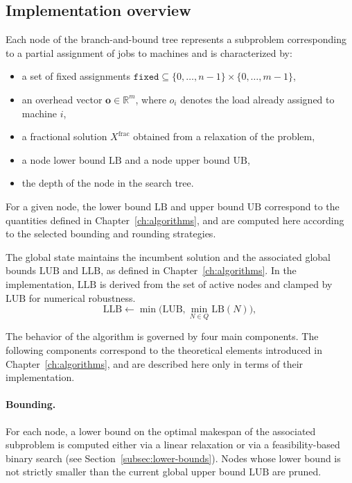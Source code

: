 \subsection{Implementation overview}

Each node of the branch-and-bound tree represents a subproblem corresponding to a partial assignment of jobs to machines and is characterized by:
\begin{itemize}
  \item a set of fixed assignments \(\texttt{fixed} \subseteq \{0,\dots,n-1\} \times \{0,\dots,m-1\}\),
  \item an overhead vector $\mathbf{o} \in \mathbb{R}^m$, where $o_i$ denotes the load already assigned to machine $i$,
  \item a fractional solution \(X^{\text{frac}}\) obtained from a relaxation of the problem,
  \item a node lower bound \(\text{LB}\) and a node upper bound \(\text{UB}\),
  \item the depth of the node in the search tree.
\end{itemize}

For a given node, the lower bound \(\text{LB}\) and upper bound \(\text{UB}\) correspond to the quantities defined in Chapter~\ref{ch:algorithms}, and are computed here according to the selected bounding and rounding strategies.

The global state maintains the incumbent solution and the associated global bounds \(\text{LUB}\) and \(\text{LLB}\), as defined in Chapter~\ref{ch:algorithms}.
In the implementation, \(\text{LLB}\) is derived from the set of active nodes and clamped by \(\text{LUB}\) for numerical robustness.
\[
\mathrm{LLB} \gets \min\bigl(\mathrm{LUB}, \min_{N \in Q} \mathrm{LB}(N)\bigr),
\]

\medskip
The behavior of the algorithm is governed by four main components.
The following components correspond to the theoretical elements introduced in Chapter~\ref{ch:algorithms}, and are described here only in terms of their implementation.

\paragraph{Bounding.}
For each node, a lower bound on the optimal makespan of the associated subproblem is computed either via a linear relaxation or via a feasibility-based binary search (see Section~\ref{subsec:lower-bounds}).
Nodes whose lower bound is not strictly smaller than the current global upper bound \(\text{LUB}\) are pruned.

